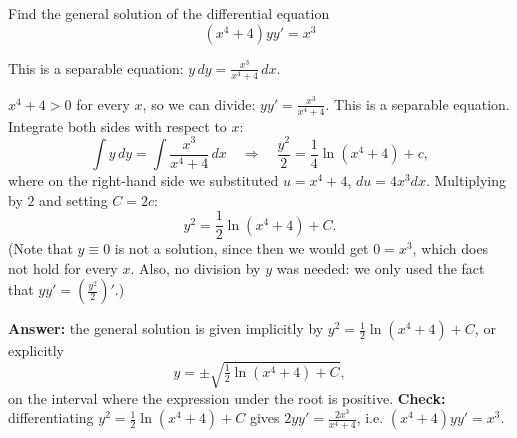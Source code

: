 
\begin{question}
Find the general solution of the differential equation
\[ (x^4 + 4)yy' = x^3 \]
\end{question}

\begin{hint}
This is a separable equation: $y\,dy = \frac{x^3}{x^4 + 4}\,dx$.
\end{hint}

\begin{solution}
$x^4 + 4 > 0$ for every $x$, so we can divide: $y y' = \frac{x^3}{x^4 + 4}$. This is a separable equation. Integrate both sides with respect to $x$:
\[ \int y\,dy = \int\frac{x^3}{x^4 + 4}\,dx \quad\Longrightarrow\quad \frac{y^2}{2} = \frac14\ln(x^4 + 4) + c, \]
where on the right-hand side we substituted $u = x^4 + 4$, $du = 4x^3dx$. Multiplying by $2$ and setting $C = 2c$:
\[ y^2 = \frac12\ln(x^4 + 4) + C. \]
(Note that $y\equiv0$ is not a solution, since then we would get $0 = x^3$, which does not hold for every $x$. Also, no division by $y$ was needed: we only used the fact that $yy' = \left(\frac{y^2}{2}\right)'$.)

\textbf{Answer:} the general solution is given implicitly by $y^2 = \frac12\ln(x^4+4) + C$, or explicitly
\[ y = \pm\sqrt{\tfrac12\ln(x^4 + 4) + C}, \]
on the interval where the expression under the root is positive. \textbf{Check:} differentiating $y^2 = \frac12\ln(x^4+4)+C$ gives $2yy' = \frac{2x^3}{x^4+4}$, i.e. $(x^4+4)yy' = x^3$.
\end{solution}
